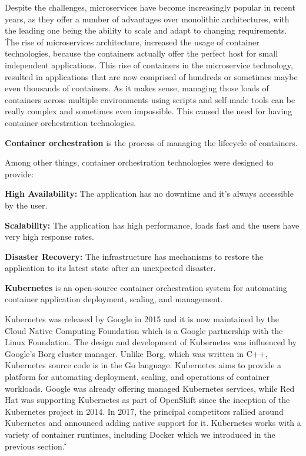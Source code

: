 Despite the challenges, microservices have become increasingly popular in recent years, as they offer a number of
advantages over monolithic architectures, with the leading one being the ability to scale and adapt to changing
requirements. \v

The rise of microservices architecture, increased the usage of container technologies, because the containers
actually offer the perfect host for small independent applications. This rise of containers in the microservice
technology, resulted in applications that are now comprised of hundreds or sometimes maybe even thousands of
containers. As it makes sense, managing those loads of containers across multiple environments using scripts and
self-made tools can be really complex and sometimes even impossible. This caused the need for having container
orchestration technologies.

\textbf{Container orchestration} is the process of managing the lifecycle of containers.
\ed

Among other things, container orchestration technologies were designed to provide:
\bit
\item \textbf{High Availability:} The application has no downtime and it's always accessible by the user.
\item \textbf{Scalability:} The application has high performance, loads fast and the users have very high response rates.
\item \textbf{Disaster Recovery:} The infrastructure has mechanisms to restore the application to its latest state after
an unexpected disaster.
\eit

\bd[Kubernetes]
\textbf{Kubernetes} is an open-source container orchestration system for automating container application deployment,
scaling, and management.
\ed

Kubernetes was released by Google in 2015 and it is now maintained by the Cloud Native Computing Foundation which is a
Google partnership with the Linux Foundation. The design and development of Kubernetes was influenced by Google's Borg
cluster manager. Unlike Borg, which was written in C++, Kubernetes source code is in the Go language. \v

Kubernetes aims to provide a platform for automating deployment, scaling, and operations of container workloads.
Google was already offering managed Kubernetes services, while Red Hat was supporting Kubernetes as part of OpenShift
since the inception of the Kubernetes project in 2014. In 2017, the principal competitors rallied around Kubernetes
and announced adding native support for it. Kubernetes works with a variety of container runtimes, including Docker
which we introduced in the previous section. \v

